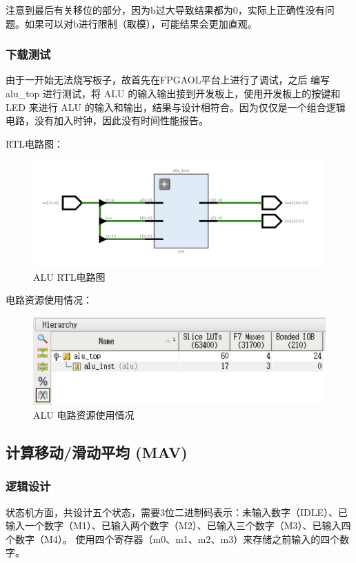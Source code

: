 \documentclass[a4paper]{article}
\begin{document}
注意到最后有关移位的部分，因为b过大导致结果都为0，实际上正确性没有问题。如果可以对b进行限制（取模），可能结果会更加直观。
\subsubsection{下载测试}
由于一开始无法烧写板子，故首先在FPGAOL平台上进行了调试，之后
编写 alu\_top 进行测试，将 ALU 的输入输出接到开发板上，使用开发板上的按键和 LED 来进行 ALU 的输入和输出，结果与设计相符合。因为仅仅是一个组合逻辑电路，没有加入时钟，因此没有时间性能报告。

RTL电路图：
\begin{figure}[H]
  \centering
  \includegraphics[width=1.0\textwidth]{alu_rtl.png}
  \caption{ALU RTL电路图}
  \label{fig:alu_rtl}
\end{figure}

电路资源使用情况：
\begin{figure}[H]
  \centering
  \includegraphics[width=1.0\textwidth]{alu_cir.png}
  \caption{ALU 电路资源使用情况}
  \label{fig:alu_rtl}
\end{figure}

\subsection{计算移动/滑动平均 (MAV) }
\subsubsection{逻辑设计}
状态机方面，共设计五个状态，需要3位二进制码表示：未输入数字（IDLE）、已输入一个数字（M1）、已输入两个数字（M2）、已输入三个数字（M3）、已输入四个数字（M4）。
使用四个寄存器（m0、m1、m2、m3）来存储之前输入的四个数字。
\end{document}
